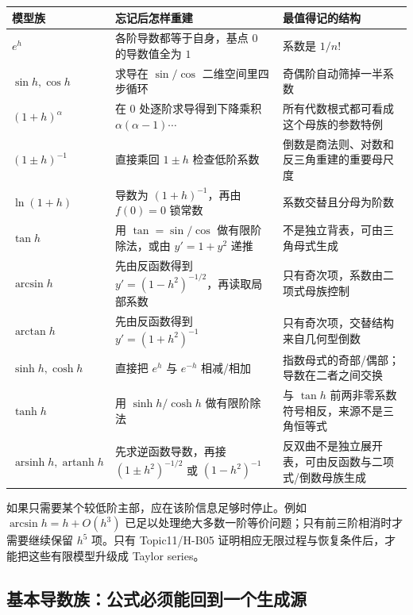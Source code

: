 \documentclass[11pt,a4paper]{ctexart}
\begin{document}
\begin{center}
\begin{tabularx}{\linewidth}{L{3.0cm}L{4.4cm}Y}
\toprule
\textbf{模型族} & \textbf{忘记后怎样重建} & \textbf{最值得记的结构}\\
\midrule
$e^h$ & 各阶导数都等于自身，基点 $0$ 的导数值全为 $1$ & 系数是 $1/n!$\\
$\sin h,\cos h$ & 求导在 $\sin/\cos$ 二维空间里四步循环 & 奇偶阶自动筛掉一半系数\\
$(1+h)^\alpha$ & 在 $0$ 处逐阶求导得到下降乘积 $\alpha(\alpha-1)\cdots$ & 所有代数根式都可看成这个母族的参数特例\\
$(1\pm h)^{-1}$ & 直接乘回 $1\pm h$ 检查低阶系数 & 倒数是商法则、对数和反三角重建的重要母尺度\\
$\ln(1+h)$ & 导数为 $(1+h)^{-1}$，再由 $f(0)=0$ 锁常数 & 系数交替且分母为阶数\\
$\tan h$ & 用 $\tan=\sin/\cos$ 做有限阶除法，或由 $y'=1+y^2$ 递推 & 不是独立背表，可由三角母式生成\\
$\arcsin h$ & 先由反函数得到 $y'=(1-h^2)^{-1/2}$，再读取局部系数 & 只有奇次项，系数由二项式母族控制\\
$\arctan h$ & 先由反函数得到 $y'=(1+h^2)^{-1}$ & 只有奇次项，交替结构来自几何型倒数\\
$\sinh h,\cosh h$ & 直接把 $e^h$ 与 $e^{-h}$ 相减/相加 & 指数母式的奇部/偶部；导数在二者之间交换\\
$\tanh h$ & 用 $\sinh h/\cosh h$ 做有限阶除法 & 与 $\tan h$ 前两非零系数符号相反，来源不是三角恒等式\\
$\operatorname{arsinh}h,\operatorname{artanh}h$ & 先求逆函数导数，再接 $(1\pm h^2)^{-1/2}$ 或 $(1-h^2)^{-1}$ & 反双曲不是独立展开表，可由反函数与二项式/倒数母族生成\\
\bottomrule
\end{tabularx}
\end{center}

如果只需要某个较低阶主部，应在该阶信息足够时停止。例如 $\arcsin h=h+O(h^3)$ 已足以处理绝大多数一阶等价问题；只有前三阶相消时才需要继续保留 $h^5$ 项。只有 Topic11/H-B05 证明相应无限过程与恢复条件后，才能把这些有限模型升级成 Taylor series。

\subsection{基本导数族：公式必须能回到一个生成源}
\end{document}
